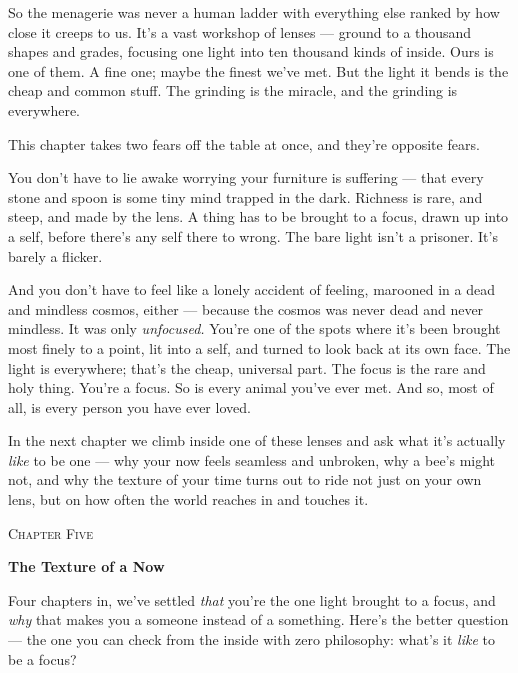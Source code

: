 \documentclass[11pt,openany]{book}
\begin{document}
So the menagerie was never a human ladder with everything else ranked by how close it creeps to us. It’s a vast workshop of lenses — ground to a thousand shapes and grades, focusing one light into ten thousand kinds of inside. Ours is one of them. A fine one; maybe the finest we’ve met. But the light it bends is the cheap and common stuff. The grinding is the miracle, and the grinding is everywhere.

This chapter takes two fears off the table at once, and they’re opposite fears.

You don’t have to lie awake worrying your furniture is suffering — that every stone and spoon is some tiny mind trapped in the dark. Richness is rare, and steep, and made by the lens. A thing has to be brought to a focus, drawn up into a self, before there’s any self there to wrong. The bare light isn’t a prisoner. It’s barely a flicker.

And you don’t have to feel like a lonely accident of feeling, marooned in a dead and mindless cosmos, either — because the cosmos was never dead and never mindless. It was only \textit{unfocused.} You’re one of the spots where it’s been brought most finely to a point, lit into a self, and turned to look back at its own face. The light is everywhere; that’s the cheap, universal part. The focus is the rare and holy thing. You’re a focus. So is every animal you’ve ever met. And so, most of all, is every person you have ever loved.

In the next chapter we climb inside one of these lenses and ask what it’s actually \textit{like} to be one — why your now feels seamless and unbroken, why a bee’s might not, and why the texture of your time turns out to ride not just on your own lens, but on how often the world reaches in and touches it.


\clearpage
\vspace*{0.6in}
{\centering\scshape\large Chapter Five\par}
\vspace{0.8em}
{\centering\bfseries\fontsize{20}{24}\selectfont The Texture of a Now\par}
\vspace{1.6em}

Four chapters in, we’ve settled \textit{that} you’re the one light brought to a focus, and \textit{why} that makes you a someone instead of a something. Here’s the better question — the one you can check from the inside with zero philosophy: what’s it \textit{like} to be a focus?
\end{document}
